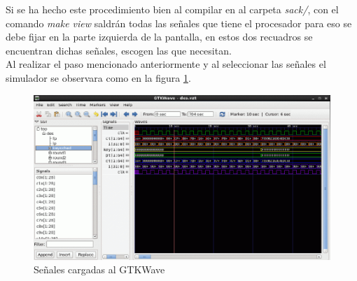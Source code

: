 \documentclass[10pt,graphicx,caption,rotating]{article}
\begin{document}
Si se ha hecho este procedimiento bien al compilar en al carpeta \textit{sack/}, con el comando \textit{make view} saldrán todas las señales que tiene el procesador para eso se debe fijar en la parte izquierda de la pantalla, en estos dos recuadros se encuentran dichas señales, escogen las que necesitan.\\
Al realizar el paso mencionado anteriormente  y al seleccionar las señales el simulador se observara como en la figura \ref{fig2}.
\begin{figure}[H]
	\centering
		\includegraphics[scale=0.6]{2.png}
	\caption{Señales cargadas al GTKWave}
	\label{fig2}
\end{figure}
\end{document}
